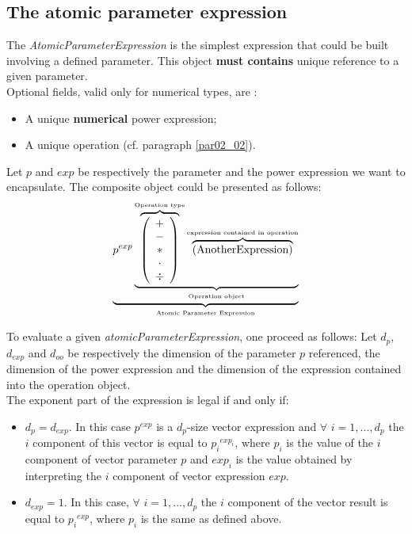 \documentclass[11pt]{amsart}
\begin{document}
\subsection{The atomic parameter expression}\label{par02_01}
The {\it AtomicParameterExpression} is the simplest expression that could be built involving a defined parameter. This object {\bf must contains} unique reference to a given parameter.\\

Optional fields, valid only for numerical types, are : 
\begin{itemize}
\item A unique {\bf numerical} power expression;
\item A unique operation (cf. paragraph \ref{par02_02}).\\
\end{itemize}
Let $p$ and $exp$ be respectively the parameter and the power expression we want to encapsulate. The composite object could be presented as follows:
\begin{equation}\label{eq01}
 \underbrace{  p^{exp} \underbrace{  \overbrace{\left( \begin{array}{c} + \\ - \\ \ast  \\ \cdot \\ \div   \end{array} \right) }^{\mbox{\tiny Operation type}}
 \overbrace{    \left( \mbox{AnotherExpression}\right) }^{\mbox{\tiny expression contained in operation}}   }_{\mbox{\tiny Operation object}}}_{\mbox{\tiny Atomic Parameter Expression}}
\end{equation}

To evaluate a given {\it atomicParameterExpression}, one proceed as follows: 
Let $d_p$, $d_{exp}$ and $d_{oo}$ be respectively the dimension of the parameter $p$ referenced, the dimension of the power expression and the dimension of the expression contained into the operation object.\\
The exponent part of the expression is legal if and only if:
\begin{itemize}
\item $d_p=d_{exp}$. In this case $p^{exp}$ is a $d_p$-size vector expression and $\forall$ $i=1,...,d_p$ the $i$ component of this vector is equal to ${p_i}^{exp_i}$, where $p_i$ is the value of the $i$ component of vector parameter $p$ and $exp_i$ is the value obtained by interpreting the $i$ component of vector expression $exp$.
\item $d_{exp}=1$. In this case, $\forall$ $i=1,...,d_p$ the $i$ component of the vector result is equal to ${p_i}^{exp}$, where $p_i$ is the same as defined above.\\
\end{itemize} 
\end{document}
